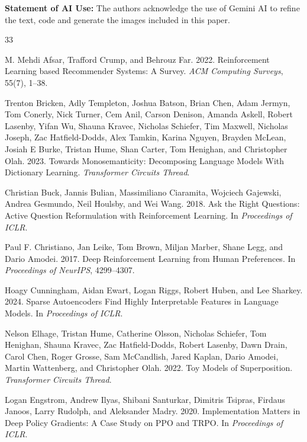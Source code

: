 \documentclass[sigconf]{acmart}
\begin{document}
\begin{acks}
\textbf{Statement of AI Use:} The authors acknowledge the use of Gemini AI to refine the text, code and generate the images included in this paper.
\end{acks}



\begin{thebibliography}{33}

M. Mehdi Afsar, Trafford Crump, and Behrouz Far. 2022. Reinforcement Learning based Recommender Systems: A Survey. \textit{ACM Computing Surveys}, 55(7), 1--38.

Trenton Bricken, Adly Templeton, Joshua Batson, Brian Chen, Adam Jermyn, Tom Conerly, Nick Turner, Cem Anil, Carson Denison, Amanda Askell, Robert Lasenby, Yifan Wu, Shauna Kravec, Nicholas Schiefer, Tim Maxwell, Nicholas Joseph, Zac Hatfield-Dodds, Alex Tamkin, Karina Nguyen, Brayden McLean, Josiah E Burke, Tristan Hume, Shan Carter, Tom Henighan, and Christopher Olah. 2023. Towards Monosemanticity: Decomposing Language Models With Dictionary Learning. \textit{Transformer Circuits Thread}.

Christian Buck, Jannis Bulian, Massimiliano Ciaramita, Wojciech Gajewski, Andrea Gesmundo, Neil Houlsby, and Wei Wang. 2018. Ask the Right Questions: Active Question Reformulation with Reinforcement Learning. In \textit{Proceedings of ICLR}.

Paul F. Christiano, Jan Leike, Tom Brown, Miljan Marber, Shane Legg, and Dario Amodei. 2017. Deep Reinforcement Learning from Human Preferences. In \textit{Proceedings of NeurIPS}, 4299--4307.

Hoagy Cunningham, Aidan Ewart, Logan Riggs, Robert Huben, and Lee Sharkey. 2024. Sparse Autoencoders Find Highly Interpretable Features in Language Models. In \textit{Proceedings of ICLR}.

Nelson Elhage, Tristan Hume, Catherine Olsson, Nicholas Schiefer, Tom Henighan, Shauna Kravec, Zac Hatfield-Dodds, Robert Lasenby, Dawn Drain, Carol Chen, Roger Grosse, Sam McCandlish, Jared Kaplan, Dario Amodei, Martin Wattenberg, and Christopher Olah. 2022. Toy Models of Superposition. \textit{Transformer Circuits Thread}.

Logan Engstrom, Andrew Ilyas, Shibani Santurkar, Dimitris Tsipras, Firdaus Janoos, Larry Rudolph, and Aleksander Madry. 2020. Implementation Matters in Deep Policy Gradients: A Case Study on PPO and TRPO. In \textit{Proceedings of ICLR}.


\end{thebibliography}
\end{document}

